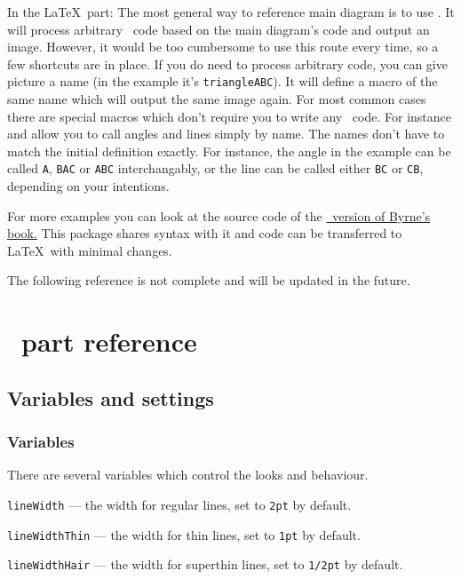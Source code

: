 \documentclass{ltxdoc}
\begin{document}
In the \LaTeX\ part: 
The most general way to reference main diagram is to use . It will process arbitrary \METAPOST\ code based on the main diagram's code and output an image. However, it would be too cumbersome to use this route every time, so a few shortcuts are in place. If you do need to process arbitrary code, you can give picture a name (in the example it's \texttt{triangleABC}). It will define a macro of the same name  which will output the same image again. For most common cases there are special macros which don't require you to write any \METAPOST\ code. For instance  and  allow you to call angles and lines simply by name. The names don't have to match the initial definition exactly. For instance, the angle in the example can be called \texttt{A}, \texttt{BAC} or \texttt{ABC} interchangably, or the line can be called either \texttt{BC} or \texttt{CB}, depending on your intentions.

For more examples you can look at the source code of the \href{https://github.com/jemmybutton/byrne-euclid/}{\ConTeXt\ version of Byrne's book.} This package shares syntax with it and code can be transferred to \LaTeX\ with minimal changes.

The following reference is not complete and will be updated in the future.

\section{\METAPOST\ part reference}

\subsection{Variables and settings}

\subsubsection{Variables}\label{Variable}
	
	There are several variables which control the looks and behaviour.
	
	\texttt{lineWidth} — the width for regular lines, set to \texttt{2pt} by default.
	
	\texttt{lineWidthThin} — the width for thin lines, set to \texttt{1pt} by default. 
	
	\texttt{lineWidthHair} — the width for superthin lines, set to \texttt{1/2pt} by default.
	
\end{document}
